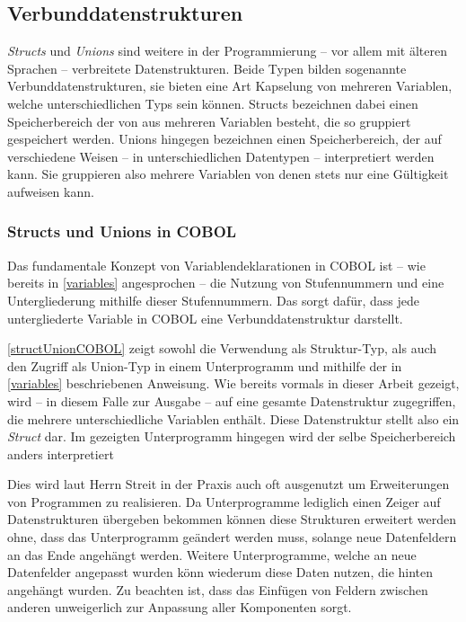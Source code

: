 \subsection{Verbunddatenstrukturen}\label{verbunddatenstrukturen}
\textit{Structs} und \textit{Unions} sind weitere in der Programmierung -- vor allem mit älteren Sprachen -- verbreitete Datenstrukturen. Beide Typen bilden sogenannte Verbunddatenstrukturen, \dh sie bieten eine Art Kapselung von mehreren Variablen, welche unterschiedlichen Typs sein können. Structs bezeichnen dabei einen Speicherbereich der von aus mehreren Variablen besteht, die so gruppiert gespeichert werden. Unions hingegen bezeichnen einen Speicherbereich, der auf verschiedene Weisen -- in unterschiedlichen Datentypen -- interpretiert werden kann. Sie gruppieren also mehrere Variablen von denen stets nur eine Gültigkeit aufweisen kann.

\subsubsection*{Structs und Unions in COBOL}

Das fundamentale Konzept von Variablendeklarationen in COBOL ist -- wie bereits in \autoref{variables} angesprochen -- die Nutzung von Stufennummern und eine Untergliederung mithilfe dieser Stufennummern. Das sorgt dafür, dass jede untergliederte Variable in COBOL eine Verbunddatenstruktur darstellt.


\autoref{structUnionCOBOL} zeigt sowohl die Verwendung als Struktur-Typ, als auch den Zugriff als Union-Typ in einem Unterprogramm und mithilfe der in \autoref{variables} beschriebenen  Anweisung. Wie bereits vormals in dieser Arbeit gezeigt, wird -- in diesem Falle zur Ausgabe -- auf eine gesamte Datenstruktur zugegriffen, die mehrere unterschiedliche Variablen enthält. Diese Datenstruktur stellt also ein \textit{Struct} dar. Im gezeigten Unterprogramm hingegen wird der selbe Speicherbereich anders interpretiert

Dies wird laut Herrn Streit in der Praxis auch oft ausgenutzt um Erweiterungen von Programmen zu realisieren. Da Unterprogramme lediglich einen Zeiger auf Datenstrukturen übergeben bekommen können diese Strukturen erweitert werden ohne, dass das Unterprogramm geändert werden muss, solange neue Datenfeldern an das Ende angehängt werden. Weitere Unterprogramme, welche an neue Datenfelder angepasst wurden könn wiederum diese Daten nutzen, die hinten angehängt wurden. Zu beachten ist, dass das Einfügen von Feldern zwischen anderen unweigerlich zur Anpassung aller Komponenten sorgt.


